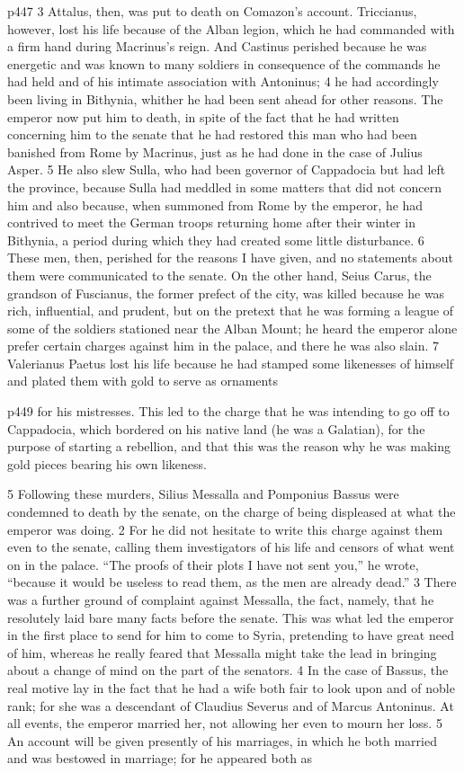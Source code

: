 p447
3
Attalus, then, was put to death on Comazon's account. Triccianus, however, lost his life because of the Alban legion, which he had commanded with a firm hand during Macrinus's reign. And Castinus perished because he was energetic and was known to many soldiers in consequence of the commands he had held and of his intimate association with Antoninus; 4 he had accordingly been living in Bithynia, whither he had been sent ahead for other reasons. The emperor now put him to death, in spite of the fact that he had written concerning him to the senate that he had restored this man who had been banished from Rome by Macrinus, just as he had done in the case of Julius Asper. 5 He also slew Sulla, who had been governor of Cappadocia but had left the province, because Sulla had meddled in some matters that did not concern him and also because, when summoned from Rome by the emperor, he had contrived to meet the German troops returning home after their winter in Bithynia, a period during which they had created some little disturbance. 6 These men, then, perished for the reasons I have given, and no statements about them were communicated to the senate. On the other hand, Seius Carus, the grandson of Fuscianus, the former prefect of the city, was killed because he was rich, influential, and prudent, but on the pretext that he was forming a league of some of the soldiers stationed near the Alban Mount; he heard the emperor alone prefer certain charges against him in the palace, and there he was also slain. 7 Valerianus Paetus lost his life because he had stamped some likenesses of himself and plated them with gold to serve as ornaments

p449 for his mistresses. This led to the charge that he was intending to go off to Cappadocia, which bordered on his native land (he was a Galatian), for the purpose of starting a rebellion, and that this was the reason why he was making gold pieces bearing his own likeness.

5
Following these murders, Silius Messalla and Pomponius Bassus were condemned to death by the senate, on the charge of being displeased at what the emperor was doing. 2 For he did not hesitate to write this charge against them even to the senate, calling them investigators of his life and censors of what went on in the palace. ``The proofs of their plots I have not sent you,'' he wrote, ``because it would be useless to read them, as the men are already dead.'' 3 There was a further ground of complaint against Messalla, the fact, namely, that he resolutely laid bare many facts before the senate. This was what led the emperor in the first place to send for him to come to Syria, pretending to have great need of him, whereas he really feared that Messalla might take the lead in bringing about a change of mind on the part of the senators. 4 In the case of Bassus, the real motive lay in the fact that he had a wife both fair to look upon and of noble rank; for she was a descendant of Claudius Severus and of Marcus Antoninus. At all events, the emperor married her, not allowing her even to mourn her loss. 5 An account will be given presently of his marriages, in which he both married and was bestowed in marriage; for he appeared both as

